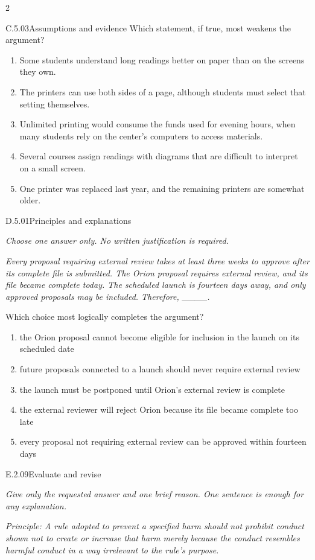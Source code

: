 \documentclass[9pt]{extarticle}
\newcommand{\choice}[1]{\item #1}
\begin{document}
\begin{multicols}{2}
\begin{DenseCoreProblem}{C.5.03}{Assumptions and evidence}
Which statement, if true, most weakens the argument?
\begin{enumerate}[label=(\alph*)]
  \choice{Some students understand long readings better on paper than on the screens they own.}
  \choice{The printers can use both sides of a page, although students must select that setting themselves.}
  \choice{Unlimited printing would consume the funds used for evening hours, when many students rely on the center's computers to access materials.}
  \choice{Several courses assign readings with diagrams that are difficult to interpret on a small screen.}
  \choice{One printer was replaced last year, and the remaining printers are somewhat older.}
\end{enumerate}
\end{DenseCoreProblem}
\begin{DenseCoreProblem}{D.5.01}{Principles and explanations}
{\scriptsize\textit{Choose one answer only. No written justification is required.}\par}
\emph{Every proposal requiring external review takes at least three weeks to approve after its complete file is submitted. The Orion proposal requires external review, and its file became complete today. The scheduled launch is fourteen days away, and only approved proposals may be included. Therefore, \_\_\_\_.}

Which choice most logically completes the argument?
\begin{enumerate}[label=(\alph*)]
  \choice{the Orion proposal cannot become eligible for inclusion in the launch on its scheduled date}
  \choice{future proposals connected to a launch should never require external review}
  \choice{the launch must be postponed until Orion's external review is complete}
  \choice{the external reviewer will reject Orion because its file became complete too late}
  \choice{every proposal not requiring external review can be approved within fourteen days}
\end{enumerate}
\end{DenseCoreProblem}
\begin{DenseCoreProblem}{E.2.09}{Evaluate and revise}
{\scriptsize\textit{Give only the requested answer and one brief reason. One sentence is enough for any explanation.}\par}
\emph{Principle: A rule adopted to prevent a specified harm should not prohibit conduct shown not to create or increase that harm merely because the conduct resembles harmful conduct in a way irrelevant to the rule's purpose.}


\end{DenseCoreProblem}
\end{multicols}
\end{document}
